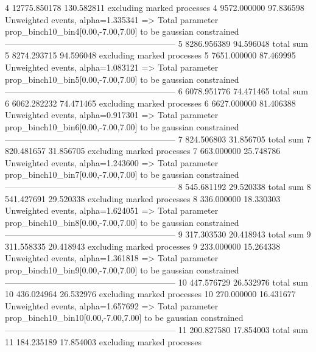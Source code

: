 4          12775.850178    130.582811      excluding marked processes    
4          9572.000000     97.836598       Unweighted events, alpha=1.335341
  => Total parameter prop_binch10_bin4[0.00,-7.00,7.00] to be gaussian constrained
------------------------------------------------------------
5          8286.956389     94.596048       total sum                     
5          8274.293715     94.596048       excluding marked processes    
5          7651.000000     87.469995       Unweighted events, alpha=1.083121
  => Total parameter prop_binch10_bin5[0.00,-7.00,7.00] to be gaussian constrained
------------------------------------------------------------
6          6078.951776     74.471465       total sum                     
6          6062.282232     74.471465       excluding marked processes    
6          6627.000000     81.406388       Unweighted events, alpha=0.917301
  => Total parameter prop_binch10_bin6[0.00,-7.00,7.00] to be gaussian constrained
------------------------------------------------------------
7          824.506803      31.856705       total sum                     
7          820.481657      31.856705       excluding marked processes    
7          663.000000      25.748786       Unweighted events, alpha=1.243600
  => Total parameter prop_binch10_bin7[0.00,-7.00,7.00] to be gaussian constrained
------------------------------------------------------------
8          545.681192      29.520338       total sum                     
8          541.427691      29.520338       excluding marked processes    
8          336.000000      18.330303       Unweighted events, alpha=1.624051
  => Total parameter prop_binch10_bin8[0.00,-7.00,7.00] to be gaussian constrained
------------------------------------------------------------
9          317.303530      20.418943       total sum                     
9          311.558335      20.418943       excluding marked processes    
9          233.000000      15.264338       Unweighted events, alpha=1.361818
  => Total parameter prop_binch10_bin9[0.00,-7.00,7.00] to be gaussian constrained
------------------------------------------------------------
10         447.576729      26.532976       total sum                     
10         436.024964      26.532976       excluding marked processes    
10         270.000000      16.431677       Unweighted events, alpha=1.657692
  => Total parameter prop_binch10_bin10[0.00,-7.00,7.00] to be gaussian constrained
------------------------------------------------------------
11         200.827580      17.854003       total sum                     
11         184.235189      17.854003       excluding marked processes    
